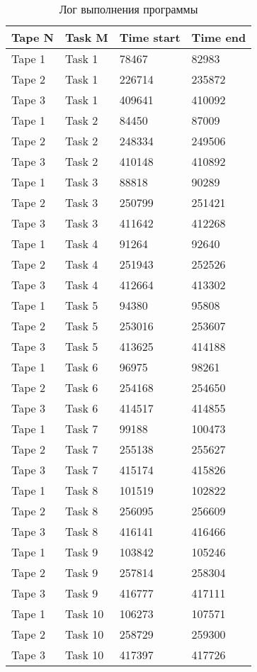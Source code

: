 \begin{table}[H]
	\centering
	\caption{Лог выполнения программы}
	\begin{tabular}{l|l|l|l}
		Tape N & Task M & Time start & Time end\\
		\hline
		Tape 1 & Task 1 & 78467 & 82983\\
		Tape 2 & Task 1 & 226714 & 235872\\
		Tape 3 & Task 1 & 409641 & 410092\\
		\hline
		Tape 1 & Task 2 & 84450 & 87009\\
		Tape 2 & Task 2 & 248334 & 249506\\
		Tape 3 & Task 2 & 410148 & 410892\\
		\hline
		Tape 1 & Task 3 & 88818 & 90289\\
		Tape 2 & Task 3 & 250799 & 251421\\
		Tape 3 & Task 3 & 411642 & 412268\\
		\hline
		Tape 1 & Task 4 & 91264 & 92640\\
		Tape 2 & Task 4 & 251943 & 252526\\
		Tape 3 & Task 4 & 412664 & 413302\\
		\hline
		Tape 1 & Task 5 & 94380 & 95808\\
		Tape 2 & Task 5 & 253016 & 253607\\
		Tape 3 & Task 5 & 413625 & 414188\\
		\hline
		Tape 1 & Task 6 & 96975 & 98261\\
		Tape 2 & Task 6 & 254168 & 254650\\
		Tape 3 & Task 6 & 414517 & 414855\\
		\hline
		Tape 1 & Task 7 & 99188 & 100473\\
		Tape 2 & Task 7 & 255138 & 255627\\
		Tape 3 & Task 7 & 415174 & 415826\\
		\hline
		Tape 1 & Task 8 & 101519 & 102822\\
		Tape 2 & Task 8 & 256095 & 256609\\
		Tape 3 & Task 8 & 416141 & 416466\\
		\hline
		Tape 1 & Task 9 & 103842 & 105246\\
		Tape 2 & Task 9 & 257814 & 258304\\
		Tape 3 & Task 9 & 416777 & 417111\\
		\hline
		Tape 1 & Task 10 & 106273 & 107571\\
		Tape 2 & Task 10 & 258729 & 259300\\
		Tape 3 & Task 10 & 417397 & 417726\\
	\end{tabular}
\end{table}

